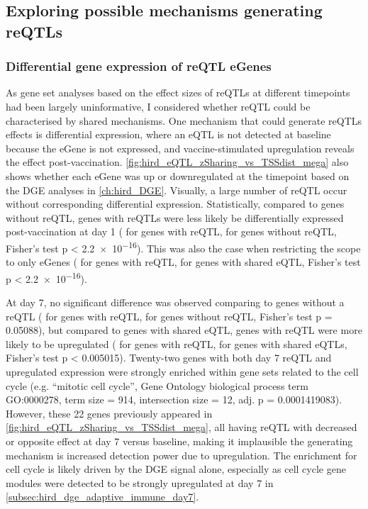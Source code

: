 \subsection{Exploring possible mechanisms generating reQTLs}

\subsubsection{Differential gene expression of reQTL eGenes}

As gene set analyses based on the effect sizes of \glspl{reQTL} at different timepoints had been largely uninformative,
I considered whether \gls{reQTL} could be characterised by shared mechanisms.
One mechanism that could generate \glspl{reQTL} effects is differential expression, where an \gls{eQTL} is not detected at baseline because the eGene is not expressed, and vaccine-stimulated upregulation reveals the effect post-vaccination.
\cref{fig:hird_eQTL_zSharing_vs_TSSdist_mega} also shows whether each eGene was up or downregulated at the timepoint based on the \gls{DGE} analyses in \cref{ch:hird_DGE}.
Visually, a large number of \gls{reQTL} occur without corresponding differential expression.
Statistically, compared to genes without reQTL,
genes with \glspl{reQTL} were less likely be differentially expressed post-vaccination at day 1 ( for genes with reQTL,  for genes without reQTL, Fisher's test p < \num{2.2e-16}).
This was also the case when restricting the scope to only eGenes ( for genes with reQTL,  for genes with shared eQTL, Fisher's test p < \num{2.2e-16}).

At day 7, 
no significant difference was observed comparing to genes without a reQTL ( for genes with reQTL,  for genes without reQTL, Fisher's test p = \num{0.05088}),
but compared to genes with shared \gls{eQTL},
genes with \gls{reQTL} were more likely to be upregulated
( for genes with reQTL,  for genes with shared eQTLs, Fisher's test p < \num{0.005015}).
Twenty-two genes with both day 7 \gls{reQTL} and upregulated expression were strongly enriched within gene sets related to the cell cycle
(e.g. \enquote{mitotic cell cycle}, Gene Ontology biological process term GO:0000278, term size = 914, intersection size = 12,  adj. p = \num{0.0001419083}).
However, these 22 genes previously appeared in \cref{fig:hird_eQTL_zSharing_vs_TSSdist_mega},
all having \gls{reQTL} with decreased or opposite effect at day 7 versus baseline,
making it implausible the generating mechanism is increased detection power due to upregulation.
The enrichment for cell cycle is likely driven by the \gls{DGE} signal alone,
especially as cell cycle gene modules were detected to be strongly upregulated at day 7 in \cref{subsec:hird_dge_adaptive_immune_day7}.

